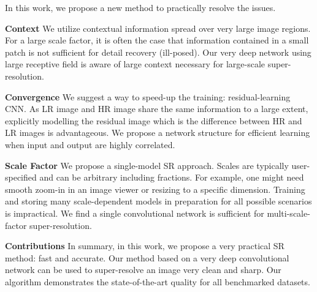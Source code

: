\documentclass[10pt,twocolumn,letterpaper]{article}
\begin{document}
In this work, we propose a new method to practically resolve the issues.


\textbf{Context} We utilize contextual information spread over very large image regions. For a large scale factor, it is often the case that information contained in a small patch is not sufficient for detail recovery (ill-posed). Our very deep network using large receptive field is aware of large context necessary for large-scale super-resolution.

\textbf{Convergence} We suggest a way to speed-up the training: residual-learning CNN. As LR image and HR image share the same information to a large extent, explicitly modelling the residual image which is the difference between HR and LR images is advantageous. We propose a network structure for efficient learning when input and output are highly correlated.

\textbf{Scale Factor} We propose a single-model SR approach. Scales are typically user-specified and can be arbitrary including fractions. For example, one might need smooth zoom-in in an image viewer or resizing to a specific dimension. Training and storing many scale-dependent models in preparation for all possible scenarios is impractical. We find a single convolutional network is sufficient for multi-scale-factor super-resolution.


\textbf{Contributions} In summary, in this work, we propose a very practical SR method: fast and accurate. Our method based on a very deep convolutional network can be used to super-resolve an image very clean and sharp. Our algorithm demonstrates the state-of-the-art quality for all benchmarked datasets.

\end{document}
